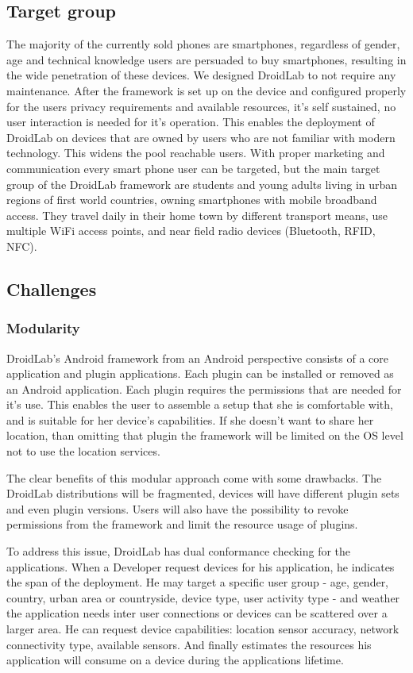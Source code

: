\documentclass[conference,letterpaper]{IEEEtran}
\begin{document}
\subsection{Target group}
The majority of the currently sold phones are smartphones, regardless of gender, age and technical knowledge users are persuaded to buy smartphones, resulting in the wide penetration of these devices. We designed DroidLab to not require any maintenance. After the framework is set up on the device and configured properly for the users privacy requirements and available resources, it's self sustained, no user interaction is needed for it's operation. This enables the deployment of DroidLab on devices that are owned by users who are not familiar with modern technology. This widens the pool reachable users. With proper marketing and communication every smart phone user can be targeted, but the main target group of the DroidLab framework are students and young adults living in urban regions of first world countries, owning smartphones with mobile broadband access. They travel daily in their home town by different transport means, use multiple WiFi access points, and near field radio devices (Bluetooth, RFID, NFC).

\subsection{Challenges}
\subsubsection{Modularity}
DroidLab's Android framework from an Android perspective consists of a core application and plugin applications. Each plugin can be installed or removed as an Android application. Each plugin requires the permissions that are needed for it's use. This enables the user to assemble a setup that she is comfortable with, and is suitable for her device's capabilities. If she doesn't want to share her location, than omitting that plugin the framework will be limited on the OS level not to use the location services.

The clear benefits of this modular approach come with some drawbacks. The DroidLab distributions will be fragmented, devices will have different plugin sets and even plugin versions. Users will also have the possibility to revoke permissions from the framework and limit the resource usage of plugins.

To address this issue, DroidLab has dual conformance checking for the applications. When a Developer request devices for his application, he indicates the span of the deployment. He may target a specific user group - age, gender, country, urban area or countryside, device type, user activity type - and weather the application needs inter user connections or devices can be scattered over a larger area. He can request device capabilities: location sensor accuracy, network connectivity type, available sensors. And finally estimates the resources his application will consume on a device during the applications lifetime.
\end{document}
